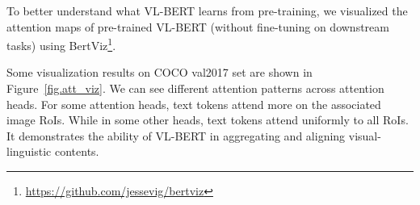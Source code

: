\documentclass{article} \usepackage{iclr2020_conference,times}
\begin{document}
\begin{figure*}

\centering




\caption{Visualization of attention maps in pre-trained VL-BERT. Line intensity indicates the magnitude of attention probability with the text token as query and the image RoI as key. The intensity is affinely rescaled to set the maximum value as 1 and the minimum as 0, across different heads in each layer. The index of network layer and attention head is counted from 0.}

\label{fig.att_viz}
\end{figure*}

To better understand what VL-BERT learns from pre-training, we visualized the attention maps of pre-trained VL-BERT (without fine-tuning on downstream tasks) using BertViz\footnote{\url{https://github.com/jessevig/bertviz}}\citep{vig2019transformervis}. 

Some visualization results on COCO \citep{lin2014microsoft,chen2015microsoft} val2017 set are shown in Figure~\ref{fig.att_viz}. We can see different attention patterns across attention heads. For some attention heads, text tokens attend more on the associated image RoIs. While in some other heads, text tokens attend uniformly to all RoIs. It demonstrates the ability of VL-BERT in aggregating and aligning visual-linguistic contents.

 
\end{document}
